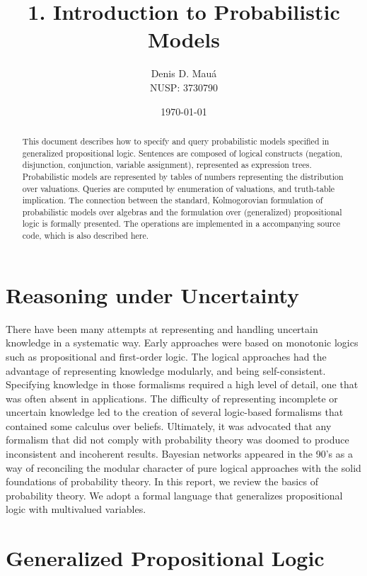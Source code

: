\documentclass{amsart}
\title[]{1. Introduction to Probabilistic Models}
\author[]{Denis D. Mau\'a\\NUSP: 3730790}
\date{\today}
\begin{document}
\begin{abstract}
  This document describes how to specify and query probabilistic models
  specified in generalized propositional logic. Sentences are composed
  of logical constructs (negation, disjunction, conjunction, variable
  assignment), represented as expression trees. Probabilistic models are
  represented by tables of numbers representing the distribution over
  valuations. Queries are computed by enumeration of valuations, and
  truth-table implication. The connection between the standard,
  Kolmogorovian formulation of probabilistic models over algebras and
  the formulation over (generalized) propositional logic is formally
  presented. The operations are implemented in a accompanying source
  code, which is also described here.
\end{abstract}


\maketitle

\section{Reasoning under Uncertainty}

There have been many attempts at representing and handling uncertain
knowledge in a systematic way. Early approaches were based on monotonic
logics such as propositional and first-order logic. The logical
approaches had the advantage of representing knowledge modularly, and
being self-consistent. Specifying knowledge in those formalisms required
a high level of detail, one that was often absent in applications. The
difficulty of representing incomplete or uncertain knowledge led to the
creation of several logic-based formalisms that contained some calculus
over beliefs. Ultimately, it was advocated that any formalism that did
not comply with probability theory was doomed to produce inconsistent
and incoherent results. Bayesian networks appeared in the 90's as a way
of reconciling the modular character of pure logical approaches with the
solid foundations of probability theory. In this report, we review the
basics of probability theory. We adopt a formal language that
generalizes propositional logic with multivalued variables.

\section{Generalized Propositional Logic}
\end{document}
